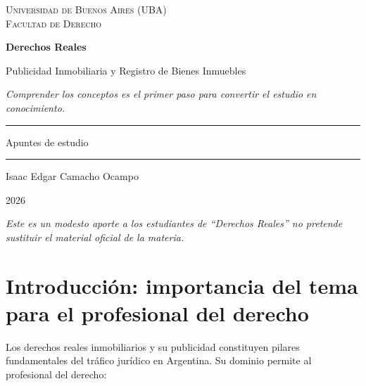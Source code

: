 \documentclass[12pt,oneside]{book}
\newcommand{\universidad}{Universidad de Buenos Aires (UBA)}
\newcommand{\facultad}{Facultad de Derecho}
\newcommand{\materia}{Derechos Reales}
\newcommand{\titulo}{Publicidad Inmobiliaria y Registro de Bienes Inmuebles}
\newcommand{\autor}{Isaac Edgar Camacho Ocampo}
\newcommand{\anio}{2026}
\begin{document}
\begin{titlepage}
\thispagestyle{empty}
\begin{center}
\vspace*{1cm}
{\large \textsc{\universidad}}\\[0.2cm]
{\large \textsc{\facultad}}

\vspace{3cm}
{\Huge \textbf{\materia}}

\vspace{1cm}
{\LARGE \titulo}

\vspace{0.8cm}
\textit{\small Comprender los conceptos es el primer paso para convertir el estudio en conocimiento.}

\vspace{1.2cm}
\rule{0.70\textwidth}{0.5pt}

\vspace{0.5cm}
{\large Apuntes de estudio}

\vspace{0.5cm}
\rule{0.70\textwidth}{0.5pt}

\vfill
{\large \autor}

\vspace{0.3cm}
{\large \anio}
\end{center}
\vfill
\begin{flushleft}
\textit{Este es un modesto aporte a los estudiantes de ``\materia'' no pretende sustituir el material oficial de la materia.}
\end{flushleft}
\end{titlepage}

\tableofcontents

\chapter*{Introducción: importancia del tema para el profesional del derecho}

Los derechos reales inmobiliarios y su publicidad constituyen pilares fundamentales del tráfico jurídico en Argentina. Su dominio permite al profesional del derecho:
\end{document}
